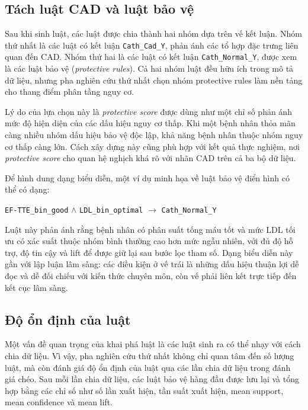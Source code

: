 \blocksep

\subsection{Tách luật CAD và luật bảo vệ}

\blocksep

Sau khi sinh luật, các luật được chia thành hai nhóm dựa trên vế kết luận. Nhóm thứ nhất là các luật có kết luận \texttt{Cath\_Cad\_Y}, phản ánh các tổ hợp đặc trưng liên quan đến CAD. Nhóm thứ hai là các luật có kết luận \texttt{Cath\_Normal\_Y}, được xem là các luật bảo vệ (\textit{protective rules}). Cả hai nhóm luật đều hữu ích trong mô tả dữ liệu, nhưng pha nghiên cứu thứ nhất chọn nhóm protective rules làm nền tảng cho thang điểm phân tầng nguy cơ.

\blocksep

Lý do của lựa chọn này là \textit{protective score} được dùng như một chỉ số phản ánh mức độ hiện diện của các dấu hiệu nguy cơ thấp. Khi một bệnh nhân thỏa mãn càng nhiều nhóm dấu hiệu bảo vệ độc lập, khả năng bệnh nhân thuộc nhóm nguy cơ thấp càng lớn. Cách xây dựng này cũng phù hợp với kết quả thực nghiệm, nơi \textit{protective score} cho quan hệ nghịch khá rõ với nhãn CAD trên cả ba bộ dữ liệu.

\blocksep

Để hình dung dạng biểu diễn, một ví dụ minh họa về luật bảo vệ điển hình có thể có dạng:
\begin{center}
\texttt{EF-TTE\_bin\_good} $\wedge$ \texttt{LDL\_bin\_optimal} $\longrightarrow$ \texttt{Cath\_Normal\_Y}
\end{center}
Luật này phản ánh rằng bệnh nhân có phân suất tống máu tốt và mức LDL tối ưu có xác suất thuộc nhóm bình thường cao hơn mức ngẫu nhiên, với đủ độ hỗ trợ, độ tin cậy và lift để được giữ lại sau bước lọc tham số. Dạng biểu diễn này gần với lập luận lâm sàng: các điều kiện ở vế trái là những dấu hiệu thuận lợi dễ đọc và dễ đối chiếu với kiến thức chuyên môn, còn vế phải liên kết trực tiếp đến kết cục lâm sàng.

\blocksep

\subsection{Độ ổn định của luật}

\blocksep

Một vấn đề quan trọng của khai phá luật là các luật sinh ra có thể nhạy với cách chia dữ liệu. Vì vậy, pha nghiên cứu thứ nhất không chỉ quan tâm đến số lượng luật, mà còn đánh giá độ ổn định của luật qua các lần chia dữ liệu trong đánh giá chéo. Sau mỗi lần chia dữ liệu, các luật bảo vệ hàng đầu được lưu lại và tổng hợp bằng các chỉ số như số lần xuất hiện, tần suất xuất hiện, mean support, mean confidence và mean lift.


